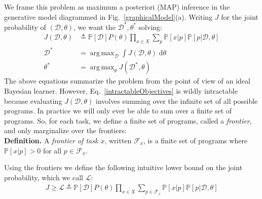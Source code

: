 \documentclass{article}
\newcommand{\lowerBound}{\mathscr{L}}
\DeclareMathOperator*{\argmax}{arg\,max} %
\newcommand{\probability}{\mathds{P}} %
\begin{document}
We frame this problem as maximum a posteriori (MAP) inference in the generative model diagrammed in Fig.~\ref{graphicalModel}(a). Writing $J$ for the joint probability of $(\mathcal{D},\theta)$, we want the $\mathcal{D}^*,\theta^*$ solving:
\begin{align}\label{intractableObjectives}
\nonumber  J(\mathcal{D},\theta)&\triangleq \probability[\mathcal{D}]P(\theta)\prod_{x\in X} \sum_p \probability[x|p]\probability[p|\mathcal{D},\theta]\\
  \mathcal{D}^* &= \argmax_{\mathcal{D}}\int J(\mathcal{D},\theta)\;\mathrm{d}\theta \\
\nonumber  \theta^*& =\argmax_\theta J(\mathcal{D}^*,\theta)
\end{align}
The above equations summarize the problem from the point of view of an ideal Bayesian learner.
However, Eq.~\ref{intractableObjectives}
is wildly intractable because evaluating $J(\mathcal{D},\theta)$ involves
summing over the  infinite set of all possible programs.
In practice we will only ever be able to sum over a finite set of programs.
So, for each task, we define a finite set of programs, called a \emph{frontier}, and only marginalize over the frontiers:
\\\noindent\textbf{Definition.} A \emph{frontier of task $x$}, written $\mathcal{F}_x$,
is a finite set of programs where $\probability[x|p] > 0$ for all $p\in \mathcal{F}_x$.

Using the frontiers we  define the following intuitive lower bound on the joint probability, which we call $\lowerBound$:
\begin{align}
 J\geq \lowerBound\triangleq\probability[\mathcal{D}]P(\theta)\prod_{x\in X} \sum_{p\in \mathcal{F}_x} \probability[x|p]\probability[p|\mathcal{D},\theta]
\end{align}


\end{document}
